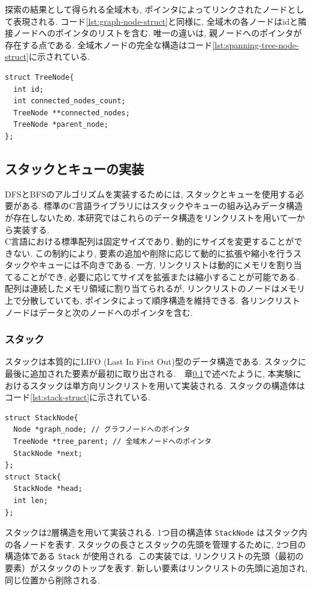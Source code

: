 \documentclass[a4j, 12pt]{jarticle}
\begin{document}
探索の結果として得られる全域木も, ポインタによってリンクされたノードとして表現される. コード\ref{lst:graph-node-struct}と同様に, 全域木の各ノードはidと隣接ノードへのポインタのリストを含む. 唯一の違いは, 親ノードへのポインタが存在する点である. 全域木ノードの完全な構造はコード\ref{lst:spanning-tree-node-struct}に示されている.

\begin{lstlisting}[caption={全域木ノードの構造},label=lst:spanning-tree-node-struct]
struct TreeNode{
  int id;
  int connected_nodes_count;
  TreeNode **connected_nodes;
  TreeNode *parent_node;
};  
\end{lstlisting}
\subsection{スタックとキューの実装}\label{sec:stack-queue}
DFSとBFSのアルゴリズムを実装するためには, スタックとキューを使用する必要がある\cite{cormen2009introduction}. 標準のC言語ライブラリにはスタックやキューの組み込みデータ構造が存在しないため, 本研究ではこれらのデータ構造をリンクリストを用いて一から実装する.\\

C言語における標準配列は固定サイズであり, 動的にサイズを変更することができない. この制約により, 要素の追加や削除に応じて動的に拡張や縮小を行うスタックやキューには不向きである. 一方, リンクリストは動的にメモリを割り当てることができ, 必要に応じてサイズを拡張または縮小することが可能である. 配列は連続したメモリ領域に割り当てられるが, リンクリストのノードはメモリ上で分散していても, ポインタによって順序構造を維持できる. 各リンクリストノードはデータと次のノードへのポインタを含む\cite{cormen2009introduction}\cite{goodrich2016data}.

\subsubsection{スタック}
スタックは本質的にLIFO (Last In First Out)型のデータ構造である. スタックに最後に追加された要素が最初に取り出される.　章\ref{sec:stack-queue}で述べたように, 本実験におけるスタックは単方向リンクリストを用いて実装される. スタックの構造体はコード\ref{lst:stack-struct}に示されている.
\begin{lstlisting}[caption=スタックの構造,label=lst:stack-struct]
struct StackNode{
  Node *graph_node; // グラフノードへのポインタ
  TreeNode *tree_parent; // 全域木ノードへのポインタ
  StackNode *next;
};
struct Stack{
  StackNode *head;
  int len;
};
\end{lstlisting}
スタックは2層構造を用いて実装される. 1つ目の構造体 \texttt{StackNode} はスタック内の各ノードを表す. スタックの長さとスタックの先頭を管理するために, 2つ目の構造体である \texttt{Stack} が使用される. この実装では, リンクリストの先頭（最初の要素）がスタックのトップを表す. 新しい要素はリンクリストの先頭に追加され, 同じ位置から削除される.
\newpage
\end{document}
